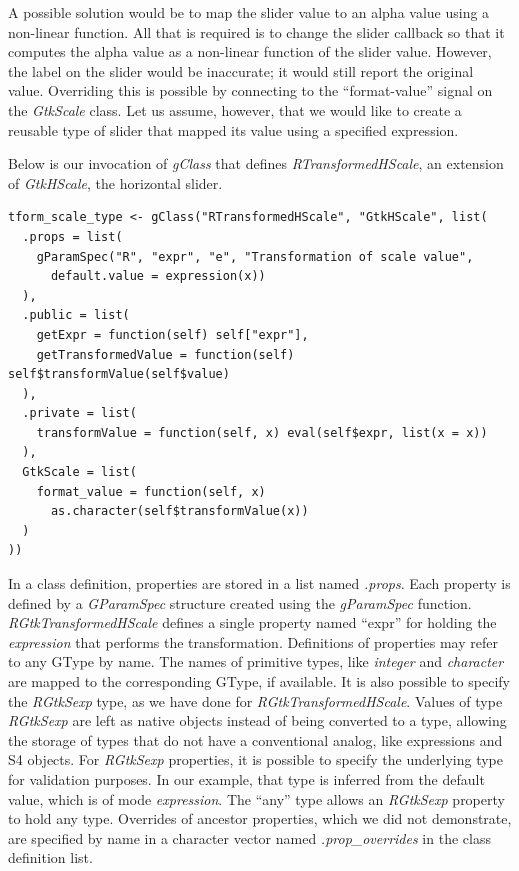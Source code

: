 \documentclass[article]{jss}
\begin{document}
A possible solution would be to map the slider value to an alpha value using a 
non-linear function. All that is
required is to change the slider callback so that it computes the
alpha value as a non-linear function of the slider value. However, the 
label on the slider would be inaccurate; it would still report the original value.
Overriding this is possible by connecting to the ``format-value'' signal on
the \emph{GtkScale} class. Let us assume, however, that we would like to create
a reusable type of slider that mapped its value using a specified  expression.

Below is our invocation of \emph{gClass} that
defines \emph{RTransformedHScale}, an extension of \emph{GtkHScale}, the horizontal slider.
\begin{verbatim}
tform_scale_type <- gClass("RTransformedHScale", "GtkHScale", list(
  .props = list(
    gParamSpec("R", "expr", "e", "Transformation of scale value",
      default.value = expression(x))
  ),
  .public = list(
    getExpr = function(self) self["expr"],
    getTransformedValue = function(self) self$transformValue(self$value)
  ),
  .private = list(
    transformValue = function(self, x) eval(self$expr, list(x = x))
  ),
  GtkScale = list(
    format_value = function(self, x)
      as.character(self$transformValue(x))
  )
))
\end{verbatim}

In a class definition, properties are stored in a list named \emph{.props}.
Each property is defined by a \emph{GParamSpec} structure created using the 
\emph{gParamSpec} function. \emph{RGtkTransformedHScale} defines a single 
property named ``expr'' for holding the  \emph{expression} that 
performs the transformation. Definitions of properties may refer to any GType by name. 
The names of primitive  types, like \emph{integer} and \emph{character} 
are mapped to the corresponding GType, if available. It is also possible to specify the 
\emph{RGtkSexp} type, as we have done for \emph{RGtkTransformedHScale}.
Values of type \emph{RGtkSexp} are left as native  objects instead
of being converted to a  type, allowing the storage of 
 types that do not have a conventional  analog, like 
expressions and S4 objects. For \emph{RGtkSexp} properties, it is possible to 
specify the underlying  type for validation purposes. In our example, 
that type is inferred from the default value, which is of mode \emph{expression}.
The ``any'' type allows an \emph{RGtkSexp} property to hold any  type.
Overrides of ancestor properties, which we did not demonstrate,
are specified by name in a character vector named \emph{.prop\_overrides} in
the class definition list.
\end{document}
